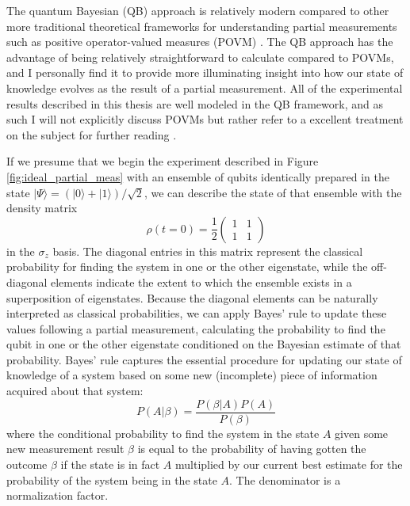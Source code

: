 The quantum Bayesian (QB) approach \cite{qu_bayes,koro11} is relatively modern compared to other more traditional theoretical frameworks for understanding partial measurements such as positive operator-valued measures (POVM) .  The QB approach has the advantage of being relatively straightforward to calculate compared to POVMs, and I personally find it to provide more illuminating insight into how our state of knowledge evolves as the result of a partial measurement.  All of the experimental results described in this thesis are well modeled in the QB framework, and as such I will not explicitly discuss POVMs but rather refer to a excellent treatment on the subject for further reading \cite{jaco06}.

If we presume that we begin the experiment described in Figure \ref{fig:ideal_partial_meas} with an ensemble of qubits identically prepared in the state $|\Psi\rangle = (|0\rangle + |1\rangle)/\sqrt{2}$, we can describe the state of that ensemble with the density matrix
\begin{equation}
\rho(t=0) = \frac{1}{2} \left( \begin{array}{cc}
1 & 1 \\
1 & 1 \end{array} \right)
\label{eq:rho_equal}
\end{equation}
in the $\sigma_z$ basis.  The diagonal entries in this matrix represent the classical probability for finding the system in one or the other eigenstate, while the off-diagonal elements indicate the extent to which the ensemble exists in a superposition of eigenstates.  Because the diagonal elements can be naturally interpreted as classical probabilities, we can apply Bayes' rule to update these values following a partial measurement, calculating the probability to find the qubit in one or the other eigenstate conditioned on the Bayesian estimate of that probability.  Bayes' rule captures the essential procedure for updating our state of knowledge of a system based on some new (incomplete) piece of information acquired about that system:
\begin{equation}
P(A|\beta) = \frac{P(\beta|A) P(A)}{P(\beta)}
\label{eq:bayes_rule}
\end{equation}
where the conditional probability to find the system in the state $A$ given some new measurement result $\beta$ is equal to the probability of having gotten the outcome $\beta$ if the state is in fact $A$ multiplied by our current best estimate for the probability of the system being in the state $A$.  The denominator is a normalization factor.


